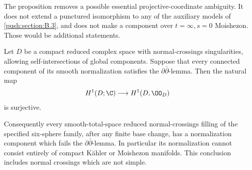 The proposition removes a possible essential projective-coordinate
ambiguity. It does not extend a punctured isomorphism to any of
the auxiliary models of \ref{push:section:B.3}, and does not make a component over
$t=\infty,s=0$ Moishezon. Those would be additional statements.

\begin{theorem}\label{push:src:B.4.5}
Let $D$ be a compact reduced complex space with normal-crossings
singularities, allowing self-intersections of global components.
Suppose that every connected component of its smooth normalization
satisfies the $\partial\bar\partial$-lemma. Then the natural map
\[
 H^1(D;\C)\longrightarrow H^1(D,\OO_D)
\]
is surjective.

Consequently every smooth-total-space reduced normal-crossings
filling of the specified six-sphere family, after any finite base
change, has a normalization component which fails the
$\partial\bar\partial$-lemma. In particular its normalization
cannot consist entirely of compact K\"ahler or Moishezon manifolds.
This conclusion includes normal crossings which are not simple.
\end{theorem}

